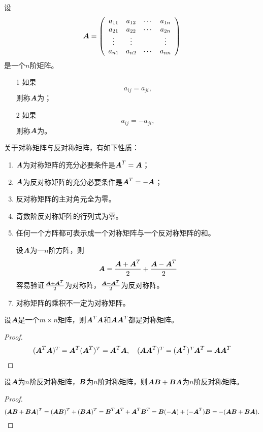 \begin{dingyi}
  设
  $$
  \MA = \left(
    \begin{array}{cccc}
      a_{11} & a_{12} & \cd & a_{1n} \\
      a_{21} & a_{22} & \cd & a_{2n} \\
      \vd   & \vd &  & \vd \\
      a_{n1} & a_{n2} & \cd & a_{nn} 
    \end{array}
  \right)
  $$
  是一个$n$阶矩阵。
  \begin{itemize}
  \item[1]
    如果
    $$
    a_{ij} = a_{ji},
    $$
    则称$\MA$为；
  \item[2]
    如果
    $$
    a_{ij} = -a_{ji},
    $$
    则称$\MA$为。
  \end{itemize}      
\end{dingyi}

\begin{zhu}
  关于对称矩阵与反对称矩阵，有如下性质：
  \begin{enumerate}
  \item $\MA$为对称矩阵的充分必要条件是$\MA^T=\MA$；
  \item $\MA$为反对称矩阵的充分必要条件是$\MA^T=-\MA$；
  \item 反对称矩阵的主对角元全为零。 
  \item 奇数阶反对称矩阵的行列式为零。
  \item 任何一个方阵都可表示成一个对称矩阵与一个反对称矩阵的和。
  \item[]  设$\MA$为一$n$阶方阵，则
    $$
    \MA = \frac{\MA+\MA^T}2 + \frac{\MA-\MA^T}2
    $$
    容易验证$\frac{\MA+\MA^T}2$为对称阵，$\frac{\MA-\MA^T}2$为反对称阵。 
  \item 对称矩阵的乘积不一定为对称矩阵。
  \item[]  
  \end{enumerate}
\end{zhu}

\begin{li}
  设$\MA$是一个$m\times n$矩阵，则$\MA^T\MA$和$\MA\MA^T$都是对称矩阵。      
\end{li}

\begin{proof}
  $$
  \begin{array}{l}
    (\MA^T\MA)^T  = \MA^T(\MA^T)^T  = \MA^T \MA, \quad
    (\MA\MA^T)^T  = (\MA^T)^T\MA^T  = \MA \MA^T
  \end{array}
  $$
\end{proof}

\begin{li}
  设$\MA$为$n$阶反对称矩阵，$\MB$为$n$阶对称矩阵，则$\MA\MB+\MB\MA$为$n$阶反对称矩阵。
\end{li}
\begin{proof}
  $$
  (\MA\MB+\MB\MA)^T =(\MA\MB)^T+(\MB\MA)^T  = \MB^T\MA^T+\MA^T\MB^T 
  = \MB(-\MA) + (-\MA^T)\MB  = - (\MA\MB+\MB\MA).      
  $$  
\end{proof}%

